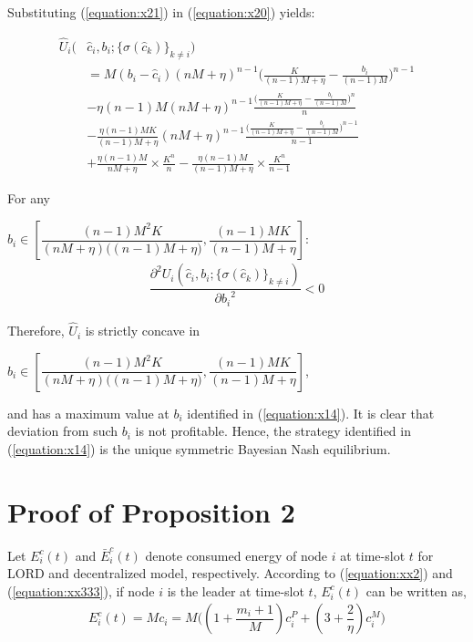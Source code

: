\documentclass[journal,12pt, onecolumn]{IEEEtran}
\begin{document}
Substituting (\ref{equation:x21}) in (\ref{equation:x20}) yields:
\begin{small}
\begin{align} 
\label{equation:x22}
\widehat{U}_i \big(&\widehat{c}_i , b_i;\{\sigma(\widehat{c}_k)\}_{k \neq i}\big) 
\nonumber
\\ &= M(b_i - \widehat{c}_i) (nM+\eta)^{n-1}\Big(\frac{K}{(n-1)M+\eta} -\frac{b_i}{(n-1)M}\Big)^{n-1} 
\nonumber
\\ &
- \eta(n-1)M(nM+\eta)^{n-1}\frac{\big(\frac{K}{(n-1)M+\eta} -\frac{b_i}{(n-1)M}\big)^{n}}{n} 
\nonumber
\\ & 
- \frac{\eta(n-1)MK}{(n-1)M+\eta}(nM+\eta)^{n-1}\frac{\big(\frac{K}{(n-1)M+\eta} -\frac{b_i}{(n-1)M}\big)^{n-1}}{n-1} 
\nonumber
\\ &
+ \frac{\eta(n-1)M}{nM+\eta}\times\frac{K^{n}}{n} - \frac{\eta(n-1)M}{(n-1)M+\eta}\times\frac{K^{n}}{n-1}
\end{align}
\end{small}
For any \begin{small} $b_i \in [\dfrac{(n-1) M^2 K}{(nM+ \eta)\big((n-1)M+\eta\big)},\dfrac{(n-1)MK}{(n-1)M+ \eta}]$:
\begin{align}
\dfrac{\partial^2{U_i (\widehat{c}_i , b_i ;\{\sigma(\widehat{c}_k)\}_{k \neq i})}}{\partial {b_i}^2}<0 \nonumber
\end{align}
\end{small}

Therefore, $\widehat{U}_i$ is strictly concave in \begin{small}
$b_i \in [\dfrac{(n-1) M^2 K}{(nM+ \eta)\big((n-1)M+\eta\big)},\dfrac{(n-1)MK}{(n-1)M+ \eta}]$,
\end{small}
and has a maximum value at $b_i$ identified in (\ref{equation:x14}). It is clear that deviation from such $b_i$ is not profitable. Hence, the strategy identified in (\ref{equation:x14}) is the unique symmetric Bayesian Nash equilibrium.

\section{Proof of Proposition 2}
\label{p_p2}
Let $E_i^c(t)$ and $\bar{E}_i^c(t)$ denote consumed energy of node $i$ at time-slot $t$ for LORD and decentralized model, respectively. According to (\ref{equation:xx2}) and (\ref{equation:xx333}), if node $i$ is the leader at time-slot 
$t$, $E_i^c(t)$ can be written as,
\begin{align}
\label{proof_p2_1}
 E_i^c(t)=Mc_i = M \Big( (1 + \dfrac{m_i +1}{M})c_i ^{P} + (3+\dfrac{2}{\eta})c_i ^{M}  \Big)  \end{align}
\end{document}
